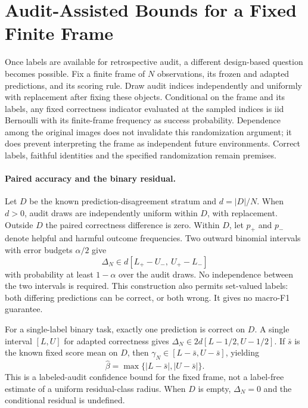 \section{Audit-Assisted Bounds for a Fixed Finite Frame}
\label{app:finite-frame-audit}

Once labels are available for retrospective audit, a different design-based question becomes possible. Fix a finite frame
of $N$ observations, its frozen and adapted predictions, and its scoring rule.
Draw audit indices independently and uniformly with replacement after fixing
these objects. Conditional on the frame and its labels, any fixed correctness
indicator evaluated at the sampled indices is iid Bernoulli with its
finite-frame frequency as success probability. Dependence among the original
images does not invalidate this randomization argument; it does prevent
interpreting the frame as independent future environments. Correct labels,
faithful identities and the specified randomization remain premises.

\paragraph{Paired accuracy and the binary residual.}
Let $D$ be the known prediction-disagreement stratum and $d=|D|/N$.
When $d>0$, audit draws are independently uniform within $D$, with replacement.
Outside $D$ the paired correctness difference is zero. Within $D$, let
$p_+$ and $p_-$ denote helpful and harmful outcome frequencies. Two outward
binomial intervals with error budgets $\alpha/2$ give
\[
 \Delta_N\in d[L_+-U_-,\ U_+-L_-]
\]
with probability at least $1-\alpha$ over the audit draws. No independence
between the two intervals is required. This construction also permits
set-valued labels: both differing predictions can be correct, or both wrong.
It gives no macro-F1 guarantee.

For a single-label binary task, exactly one prediction is correct on $D$.
A single interval $[L,U]$ for adapted correctness gives
$\Delta_N\in2d[L-1/2,U-1/2]$. If $\bar s$ is the known fixed score mean on $D$,
then $\gamma_N\in[L-\bar s,U-\bar s]$, yielding
\[
 \widehat\beta=\max\{|L-\bar s|,|U-\bar s|\}.
\]
This is a labeled-audit confidence bound for the fixed frame, not a label-free
estimate of a uniform residual-class radius. When $D$ is empty,
$\Delta_N=0$ and the conditional residual is undefined.


